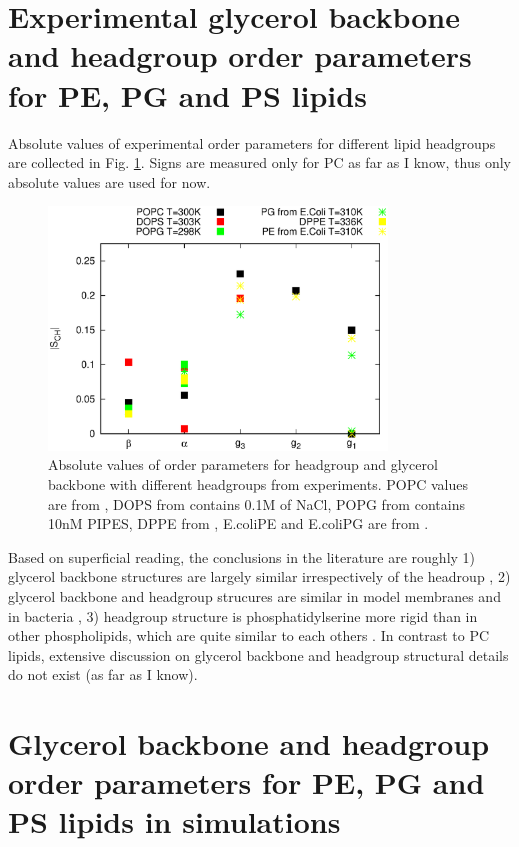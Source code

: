 \documentclass[aps,prl,superscriptaddress,twocolumn]{revtex4}
\begin{document}

\section{Experimental glycerol backbone and headgroup order parameters for PE, PG and PS lipids}

Absolute values of experimental order parameters for different lipid headgroups are
collected in Fig. \ref{HGorderParameters}. Signs are measured only for PC as far as I know,
thus only absolute values are used for now.
\begin{figure}[]
  \centering
  \includegraphics[width=9.0cm]{../Figs/HGorderparameters.eps}
  \caption{\label{HGorderParameters}
    Absolute values of order parameters for headgroup and glycerol backbone with different headgroups
    from experiments. POPC values are from \cite{ferreira13}, DOPS from \cite{browning80} contains 0.1M of NaCl,
    POPG from \cite{borle85} contains 10nM PIPES, DPPE from \cite{seelig76}, E.coliPE and E.coliPG are from \cite{gally81}.
  }
\end{figure}

Based on superficial reading, the conclusions in the literature are roughly
1) glycerol backbone structures are largely similar irrespectively of the headroup \cite{gally81},
2) glycerol backbone and headgroup strucures are similar in model membranes and in bacteria \cite{gally81,??},
3) headgroup structure is phosphatidylserine more rigid than in other phospholipids, which are quite similar to
each others \cite{??}.
In contrast to PC lipids, extensive discussion on glycerol backbone and headgroup structural details do not
exist (as far as I know).

\section{Glycerol backbone and headgroup order parameters for PE, PG and PS lipids in simulations}
\end{document}
